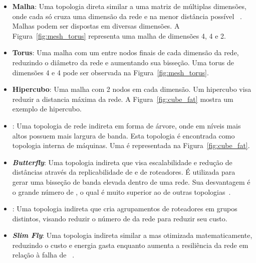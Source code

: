 \begin{itemize}
    \item \textbf{Malha}: Uma topologia direta similar a uma matriz de múltiplas dimensões, onde cada \link só cruza uma dimensão da rede e na menor distância possível ~\cite{Solihin}.
    Malhas podem ser dispostas em diversas dimensões. A Figura~\ref{fig:mesh_torus} representa uma malha de dimensões 4, 4 e 2.
    
    \item \textbf{Torus}: Uma malha com um \link entre nodos finais de cada dimensão da rede, reduzindo o diâmetro da rede e aumentando sua bisseção. 
    Uma torus de dimensões 4 e 4 pode ser observada na Figura~\ref{fig:mesh_torus}.
    
    \item \textbf{Hipercubo}: Uma malha com 2 nodos em cada dimensão.
    Um hipercubo visa reduzir a distancia máxima da rede. 
    A Figura~\ref{fig:cube_fat} mostra um exemplo de hipercubo.
    
    \item \textbf{\Fatt}: Uma topologia de rede indireta em forma de árvore, onde \links em níveis mais altos possuem mais largura de banda. 
    Esta topologia é encontrada como topologia interna de máquinas. 
    Uma \fatt é representada na Figura~\ref{fig:cube_fat}.
    
    \item \textbf{\textit{Butterfly}}: Uma topologia indireta que visa escalabilidade e redução de distâncias através da replicabilidade de \links e de roteadores.
    É utilizada para gerar uma bisseção de banda elevada dentro de uma rede.
    Sua desvantagem é o grande número de \links, o qual é muito superior ao de outras topologias~\cite{david:paralel}.
    
    \item \textbf{\Dgfly}: Uma topologia indireta que cria agrupamentos de roteadores em grupos distintos, visando reduzir o número de \links da rede para reduzir seu custo.
   
    
    \item \textbf{\textit{Slim Fly}}: Uma topologia indireta similar a \dgfly mas otimizada matematicamente, reduzindo o custo e energia gasta enquanto aumenta a resiliência da rede em relação à falha de \links~\cite{slimfly}.
\end{itemize}

